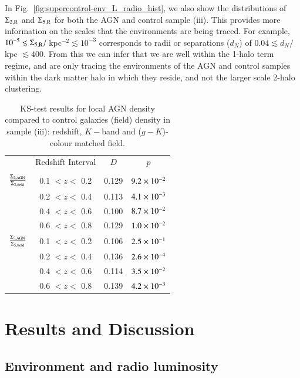 In Fig.~\ref{fig:supercontrol-env_L_radio_hist}, we also show the distributions of $\Sigma_{2,\rm{R}}$ and $\Sigma_{5,\rm{R}}$ for both the AGN and control sample (iii). This provides more information on the scales that the environments are being traced. For example, $10^{-5} \lesssim \Sigma_{5,\rm{R}} / $\,kpc$^{-2} \lesssim 10^{-3}$ corresponds to radii or separations ($d_N$) of $0.04 \lesssim d_N / \,$kpc $\lesssim 400$. From this we can infer that we are well within the 1-halo term regime, and are only tracing the environments of the AGN and control samples within the dark matter halo in which they reside, and not the larger scale 2-halo clustering.

\begin{table}
\centering
\caption[Sample (iii): L$_{1.4}$-bin KS-test results]{KS-test results for local AGN density compared to control galaxies (field) density in sample (iii): redshift, $K-$band and ($g-K$)-colour matched field.}
\label{table:sample3b}
\begin{tabular}{c | c c c}
\hline \hline
  & Redshift Interval & $D$ & $p$ \\
 & & & \\
  \hline
    $\frac{\Sigma_{2,{\rm AGN}}}{\Sigma_{2,{\rm field}}}$ 				& 0.1 $< z <$ 0.2  &	0.129  &  $9.2\times 10^{-2}$ \\	
   						 	& 0.2 $< z <$ 0.4  &	0.113  &  $4.1\times 10^{-3}$ \\	
   							& 0.4 $< z <$ 0.6  & 	0.100  &  $8.7\times 10^{-2}$ \\	
   							& 0.6 $< z <$ 0.8  &  0.129  &  $1.0\times 10^{-2}$ \\		
  \hline
  $\frac{\Sigma_{5,{\rm AGN}}}{\Sigma_{5,{\rm field}}}$ 				& 0.1 $< z <$ 0.2  &  0.106  &  $2.5\times 10^{-1}$ \\		
   							& 0.2 $< z <$ 0.4  &  0.136  &  $2.6\times 10^{-4}$ \\		
   							& 0.4 $< z <$ 0.6  &  0.114  &  $3.5\times 10^{-2}$ \\ 		
   							& 0.6 $< z <$ 0.8  &  0.139  &  $4.2\times 10^{-3}$ \\	
  \hline
  \end{tabular}
\end{table}

\section{Results and Discussion}\label{section-4}

\subsection{Environment and radio luminosity}\label{section:env-jetpower}


